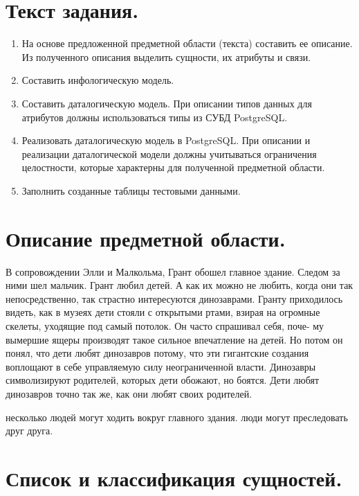
\vspace{3cm}
\tableofcontents

\newpage

\section{Текст задания.}
\begin{enumerate}
    \item На основе предложенной предметной области (текста) составить ее описание. Из полученного описания выделить сущности, их атрибуты и связи.
    \item Составить инфологическую модель.
    \item Составить даталогическую модель. При описании типов данных для атрибутов должны использоваться типы из СУБД PostgreSQL.
    \item Реализовать даталогическую модель в PostgreSQL. При описании и реализации даталогической модели должны учитываться ограничения целостности, которые характерны для полученной предметной области.
    \item Заполнить созданные таблицы тестовыми данными.
\end{enumerate}

\section{Описание предметной области.}
В сопровождении Элли и Малкольма, Грант обошел главное здание. Следом за ними шел мальчик. Грант любил детей. А как их
можно не любить, когда они так непосредственно, так страстно интересуются динозаврами. Гранту приходилось видеть, как в
музеях дети стояли с открытыми ртами, взирая на огромные скелеты, уходящие под самый потолок. Он часто спрашивал себя,
поче- му вымершие ящеры производят такое сильное впечатление на детей. Но потом он понял, что дети любят динозавров
потому, что эти гигантские создания воплощают в себе управляемую силу неограниченной власти. Динозавры символизируют
родителей, которых дети обожают, но боятся. Дети любят динозавров точно так же, как они любят своих родителей.

несколько людей могут ходить вокруг главного здания. люди могут преследовать друг друга.

\section{Список и классификация сущностей.}

